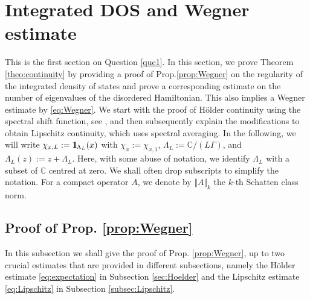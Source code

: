 \documentclass[reqno,12pt,letterpaper]{amsart}
\newcommand{\CC}{{\mathbb C}}
\numberwithin{equation}{section}
\def\indic{\operatorname{1\hskip-2.75pt\relax l}}
\begin{document}
\section{Integrated DOS and Wegner estimate}
\label{sec:IDSWeg}

This is the first section on Question \ref{que1}. In this section, we prove Theorem \ref{theo:continuity} by providing a proof of Prop.\ref{prop:Wegner} on the regularity of the integrated density of states and prove a corresponding estimate on the number of eigenvalues of the disordered Hamiltonian. This also implies a Wegner estimate by \eqref{eq:Wegner}.
 We start with the proof of H\"older continuity using the spectral shift function, see \cite{CHK,CHK03,CHN01}, and then subsequently explain the modifications to obtain Lipschitz continuity, which uses spectral averaging.
 In the following, we will write $\chi_{x,L}:=\indic_{\Lambda_L}(x)$ with $\chi_x:=\chi_{x,1}$, $\Lambda_L:=\CC/(L\Gamma)$, and $\Lambda_L(z):=z+\Lambda_L$. Here, with some abuse of notation, we identify $\Lambda_L$ with a subset of $\CC$ centred at zero. We shall often drop subscripts to simplify the notation. For a compact operator $A$, we denote by $\Vert A \Vert_k$ the $k$-th Schatten class norm. 

\subsection{Proof of Prop. \ref{prop:Wegner}}
In this subsection we shall give the proof of Prop. \ref{prop:Wegner}, up to two crucial estimates that are provided in different subsections, namely the H\"older estimate \eqref{eq:expectation} in Subsection \ref{sec:Hoelder} and the Lipschitz estimate \eqref{eq:Lipschitz} in Subsection \ref{subsec:Lipschitz}. 
\end{document}

